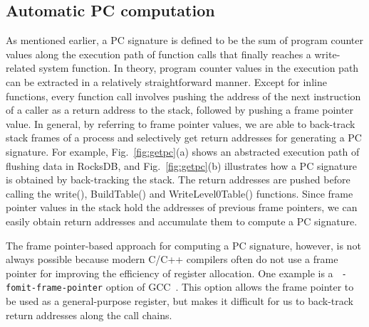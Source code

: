 

\subsection{Automatic PC computation}
As mentioned earlier, a PC signature is defined to be the sum of program counter
values along the execution path of function calls that finally reaches a
write-related system function.  In theory, program counter values in the
execution path can be extracted in a relatively straightforward manner.  Except
for inline functions, every function call involves pushing the address of the
next instruction of a caller as a return address to the stack, followed by
pushing a frame pointer value.  In general, by referring to frame pointer
values, we are able to back-track stack frames of a process and selectively get
return addresses for generating a PC signature.  For example,
Fig.~\ref{fig:getpc}(a) shows an abstracted execution path of flushing data in
RocksDB, and Fig.~\ref{fig:getpc}(b) illustrates how a PC signature is obtained
by back-tracking the stack.  The return addresses are pushed before calling the
\textsf{\small  write()}, \textsf{\small  BuildTable()} and \textsf{\small
WriteLevel0Table()} functions.  Since frame pointer values in the stack hold
the addresses of previous frame pointers, we can easily obtain return addresses
and accumulate them to compute a PC signature.  

The frame pointer-based approach for computing a PC signature, however, is not
always possible because modern C/C++ compilers often do not use a frame pointer
for improving the efficiency of register allocation.  One example is a {\tt
-fomit-frame-pointer} option of GCC~\cite{GCC}.  This option allows the frame
pointer to be used as a general-purpose register, but makes it difficult for us
to back-track return addresses along the call chains.  

